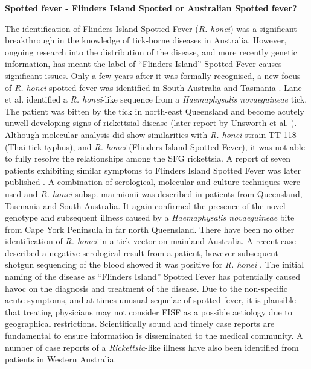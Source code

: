 \documentclass[a4paper, nobind]{templates/ociamthesis}
\begin{document}
\textbf{Spotted fever - Flinders Island Spotted or Australian Spotted fever?}

The identification of Flinders Island Spotted Fever (\emph{R. honei}) was a significant breakthrough in the knowledge of tick-borne diseases in Australia.
However, ongoing research into the distribution of the disease, and more recently genetic information, has meant the label of ``Flinders Island'' Spotted Fever causes significant issues.
Only a few years after it was formally recognised, a new focus of \emph{R. honei} spotted fever was identified in South Australia and Tasmania \autocite{dyerNewFocusRickettsia2005,unsworthNotOnlyFlinders2005}.
Lane et al. \autocite*{laneEvidenceSpottedFeverlike2005a} identified a \emph{R. honei}-like sequence from a \emph{Haemaphysalis novaeguineae} tick.
The patient was bitten by the tick in north-east Queensland and become acutely unwell developing signs of rickettsial disease (later report by Unsworth et al. \autocite*{unsworthThreeRickettsiosesDarnley2007}).
Although molecular analysis did show similarities with \emph{R. honei} strain TT-118 (Thai tick typhus), and \emph{R. honei} (Flinders Island Spotted Fever), it was not able to fully resolve the relationships among the SFG rickettsia.
A report of seven patients exhibiting similar symptoms to Flinders Island Spotted Fever was later published \autocite{unsworthThreeRickettsiosesDarnley2007}.
A combination of serological, molecular and culture techniques were used and \emph{R. honei} subsp. marmionii was described in patients from Queensland, Tasmania and South Australia.
It again confirmed the presence of the novel genotype and subsequent illness caused by a \emph{Haemaphysalis novaeguineae} bite from Cape York Peninsula in far north Queensland.
There have been no other identification of \emph{R. honei} in a tick vector on mainland Australia.
A recent case described a negative serological result from a patient, however subsequent shotgun sequencing of the blood showed it was positive for \emph{R. honei} \autocite{grahamDetectionSpottedFever2017}.
The initial naming of the disease as ``Flinders Island'' Spotted Fever has potentially caused havoc on the diagnosis and treatment of the disease.
Due to the non-specific acute symptoms, and at times unusual sequelae of spotted-fever, it is plausible that treating physicians may not consider FISF as a possible aetiology due to geographical restrictions.
Scientifically sound and timely case reports are fundamental to ensure information is disseminated to the medical community.
A number of case reports of a \emph{Rickettsia}-like illness have also been identified from patients in Western Australia.
\end{document}
